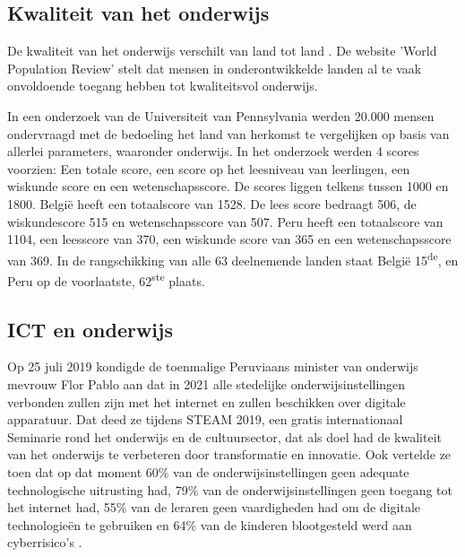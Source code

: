 \subsection{Kwaliteit van het onderwijs}
De kwaliteit van het onderwijs verschilt van land tot land \autocite{Review2020}. De website 'World Population Review' stelt dat mensen in onderontwikkelde landen al te vaak onvoldoende toegang hebben tot kwaliteitsvol onderwijs. 

In een onderzoek van de Universiteit van Pennsylvania \autocite{UsNews2020} werden 20.000 mensen ondervraagd met de bedoeling het land van herkomst te vergelijken op basis van allerlei parameters, waaronder onderwijs. In het onderzoek werden 4 scores voorzien: Een totale score, een score op het leesniveau van leerlingen, een wiskunde score en een wetenschapsscore. De scores liggen telkens tussen 1000 en 1800. België heeft een totaalscore van 1528. De lees score bedraagt 506, de wiskundescore 515 en wetenschapsscore van 507. Peru heeft een totaalscore van 1104, een leesscore van 370, een wiskunde score van 365 en een wetenschapsscore van 369. In de rangschikking van alle 63 deelnemende landen staat België 15\textsuperscript{de}, en Peru op de voorlaatste, 62\textsuperscript{ste} plaats.




\subsection{ICT en onderwijs}
Op 25 juli 2019 kondigde de toenmalige Peruviaans minister van onderwijs mevrouw Flor Pablo aan dat in 2021 alle stedelijke onderwijsinstellingen verbonden zullen zijn met het internet en zullen beschikken over digitale apparatuur. Dat deed ze tijdens STEAM 2019, een gratis internationaal Seminarie rond het onderwijs en de cultuursector, dat als doel had de kwaliteit van het onderwijs te verbeteren door transformatie en innovatie. Ook vertelde ze toen dat op dat moment 60\% van de onderwijsinstellingen geen adequate technologische uitrusting had, 79\% van de onderwijsinstellingen geen toegang tot het internet had, 55\% van de leraren geen vaardigheden had om de digitale technologieën te gebruiken en 64\% van de kinderen blootgesteld werd aan cyberrisico's \autocite{Educacion2019}.


